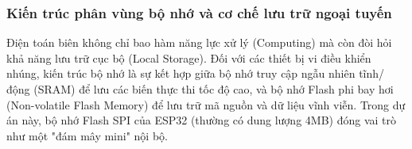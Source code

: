 
\subsubsection{Kiến trúc phân vùng bộ nhớ và cơ chế lưu trữ ngoại tuyến}
Điện toán biên không chỉ bao hàm năng lực xử lý (Computing) mà còn đòi hỏi khả năng lưu trữ cục bộ (Local Storage). Đối với các thiết bị vi điều khiển nhúng, kiến trúc bộ nhớ là sự kết hợp giữa bộ nhớ truy cập ngẫu nhiên tĩnh/động (SRAM) để lưu các biến thực thi tốc độ cao, và bộ nhớ Flash phi bay hơi (Non-volatile Flash Memory) để lưu trữ mã nguồn và dữ liệu vĩnh viễn. Trong dự án này, bộ nhớ Flash SPI của ESP32 (thường có dung lượng 4MB) đóng vai trò như một "đám mây mini" nội bộ.

